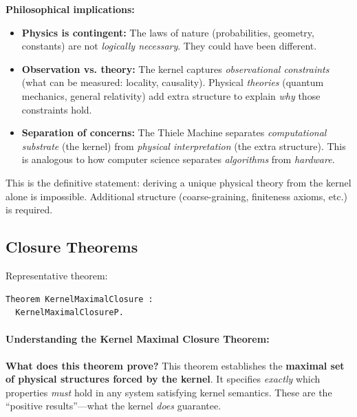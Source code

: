 \textbf{Philosophical implications:}
\begin{itemize}
    \item \textbf{Physics is contingent:} The laws of nature (probabilities, geometry, constants) are not \textit{logically necessary}. They could have been different.
    
    \item \textbf{Observation vs. theory:} The kernel captures \textit{observational constraints} (what can be measured: locality, causality). Physical \textit{theories} (quantum mechanics, general relativity) add extra structure to explain \textit{why} those constraints hold.
    
    \item \textbf{Separation of concerns:} The Thiele Machine separates \textit{computational substrate} (the kernel) from \textit{physical interpretation} (the extra structure). This is analogous to how computer science separates \textit{algorithms} from \textit{hardware}.
\end{itemize}


This is the definitive statement: deriving a unique physical theory from the kernel alone is impossible. Additional structure (coarse-graining, finiteness axioms, etc.) is required.

\subsection{Closure Theorems}

Representative theorem:
\begin{lstlisting}
Theorem KernelMaximalClosure :
  KernelMaximalClosureP.
\end{lstlisting}

\paragraph{Understanding the Kernel Maximal Closure Theorem:}

\textbf{What does this theorem prove?} This theorem establishes the \textbf{maximal set of physical structures forced by the kernel}. It specifies \textit{exactly} which properties \textit{must} hold in any system satisfying kernel semantics. These are the ``positive results''---what the kernel \textit{does} guarantee.

